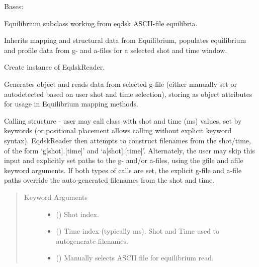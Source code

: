 \documentclass[letterpaper,10pt,english]{sphinxmanual}
\begin{document}
\begin{fulllineitems}
\label{\detokenize{eqtools:eqtools.eqdskreader.EqdskReader}}
Bases: {\hyperref[\detokenize{eqtools:eqtools.core.Equilibrium}]{}}

Equilibrium subclass working from eqdsk ASCII-file equilibria.

Inherits mapping and structural data from Equilibrium, populates equilibrium
and profile data from g- and a-files for a selected shot and time window.

Create instance of EqdskReader.

Generates object and reads data from selected g-file (either manually set or
autodetected based on user shot and time selection), storing as object
attributes for usage in Equilibrium mapping methods.

Calling structure - user may call class with shot and time (ms) values, set
by keywords (or positional placement allows calling without explicit keyword
syntax).  EqdskReader then attempts to construct filenames from the
shot/time, of the form ‘g{[}shot{]}.{[}time{]}’ and ‘a{[}shot{]}.{[}time{]}’.  Alternately,
the user may skip this input and explicitly set paths to the g- and/or
a-files, using the gfile and afile keyword arguments.  If both types of
calls are set, the explicit g-file and a-file paths override the
auto-generated filenames from the shot and time.
\begin{quote}\begin{description}
\item[{Keyword Arguments}] \leavevmode\begin{itemize}
\item {} 
 () \textendash{} Shot index.

\item {} 
 () \textendash{} Time index (typically ms).  Shot and Time used to
autogenerate filenames.

\item {} 
 () \textendash{} Manually selects ASCII file for equilibrium read.


\end{itemize}
\end{description}
\end{quote}
\end{fulllineitems}
\end{document}
